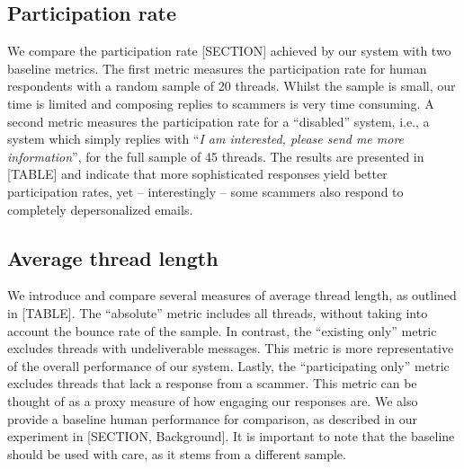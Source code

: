 \begin{center}
\end{center}

\subsection{Participation rate}
We compare the participation rate [SECTION] achieved by our system with two baseline metrics. The first metric measures the participation rate for human respondents with a random sample of 20 threads. Whilst the sample is small, our time is limited and composing replies to scammers is very time consuming. A second metric measures the participation rate for a ``disabled'' system, i.e., a system which simply replies with ``\textit{I am interested, please send me more information}'', for the full sample of 45 threads.  The results are presented in [TABLE] and indicate that more sophisticated responses yield better participation rates, yet -- interestingly -- some scammers also respond to completely depersonalized emails.

\begin{center}
\end{center}
 
\subsection{Average thread length}
We introduce and compare several measures of average thread length, as outlined in [TABLE].  The ``absolute'' metric includes all threads, without taking into account the bounce rate of the sample. In contrast, the ``existing only'' metric excludes threads with undeliverable messages. This metric is more representative of the overall performance of our system. Lastly, the ``participating only'' metric excludes threads that lack a response from a scammer. This metric can be thought of as a proxy measure of how engaging our responses are. We also provide a baseline human performance for comparison, as described in our experiment in [SECTION, Background]. It is important to note that the baseline should be used with care, as it stems from a different sample.

